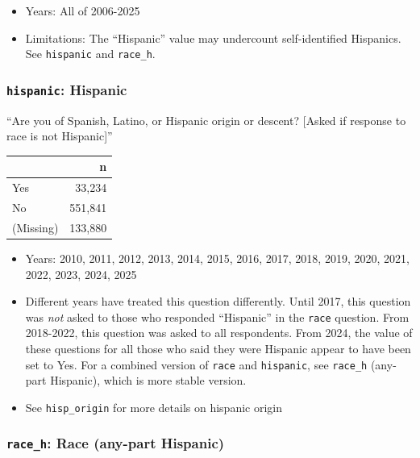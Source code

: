 \documentclass[10pt,article,oneside]{memoir}
\begin{document}
\begin{itemize}
\tightlist
\item
  Years: All of 2006-2025
\item
  Limitations: The ``Hispanic'' value may undercount self-identified
  Hispanics. See \texttt{hispanic} and \texttt{race\_h}.
\end{itemize}

\subsubsection{\texorpdfstring{\texttt{hispanic}:
Hispanic}{hispanic: Hispanic}}\label{hispanic-hispanic}

``Are you of Spanish, Latino, or Hispanic origin or descent? {[}Asked if
response to race is not Hispanic{]}''

\begin{table}[H]
\centering
\begin{tabular}[t]{lr}
\toprule
 & n\\
\midrule
Yes & 33,234\\
No & 551,841\\
(Missing) & 133,880\\
\bottomrule
\end{tabular}
\end{table}

\begin{itemize}
\tightlist
\item
  Years: 2010, 2011, 2012, 2013, 2014, 2015, 2016, 2017, 2018, 2019,
  2020, 2021, 2022, 2023, 2024, 2025
\item
  Different years have treated this question differently. Until 2017,
  this question was \emph{not} asked to those who responded ``Hispanic''
  in the \texttt{race} question. From 2018-2022, this question was asked
  to all respondents. From 2024, the value of these questions for all
  those who said they were Hispanic appear to have been set to Yes. For
  a combined version of \texttt{race} and \texttt{hispanic}, see
  \texttt{race\_h} (any-part Hispanic), which is more stable version.
\item
  See \texttt{hisp\_origin} for more details on hispanic origin
\end{itemize}

\subsubsection{\texorpdfstring{\texttt{race\_h}: Race (any-part
Hispanic)}{race\_h: Race (any-part Hispanic)}}\label{race_h-race-any-part-hispanic}
\end{document}

